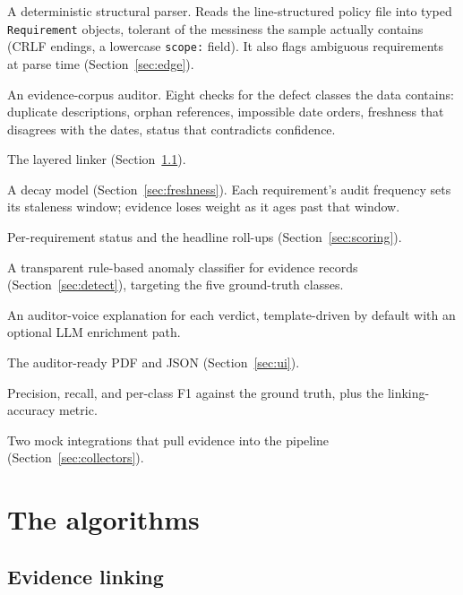 \documentclass[11pt]{article}
\newcommand{\code}[1]{\texttt{\small #1}}
\begin{document}
\begin{description}[leftmargin=0pt,style=nextline,itemsep=3pt,labelsep=0pt]
\item[\textcolor{navy}{ingest}] A deterministic structural parser. Reads the
  line-structured policy file into typed \code{Requirement} objects, tolerant of the
  messiness the sample actually contains (CRLF endings, a lowercase \code{scope:} field).
  It also flags ambiguous requirements at parse time (Section~\ref{sec:edge}).
\item[\textcolor{navy}{integrity}] An evidence-corpus auditor. Eight checks for the
  defect classes the data contains: duplicate descriptions, orphan references, impossible
  date orders, freshness that disagrees with the dates, status that contradicts confidence.
\item[\textcolor{navy}{mapping}] The layered linker (Section~\ref{sec:linking}).
\item[\textcolor{navy}{freshness}] A decay model (Section~\ref{sec:freshness}). Each
  requirement's audit frequency sets its staleness window; evidence loses weight as it ages
  past that window.
\item[\textcolor{navy}{scoring}] Per-requirement status and the headline roll-ups
  (Section~\ref{sec:scoring}).
\item[\textcolor{navy}{detect}] A transparent rule-based anomaly classifier for evidence
  records (Section~\ref{sec:detect}), targeting the five ground-truth classes.
\item[\textcolor{navy}{narrative}] An auditor-voice explanation for each verdict,
  template-driven by default with an optional LLM enrichment path.
\item[\textcolor{navy}{report}] The auditor-ready PDF and JSON (Section~\ref{sec:ui}).
\item[\textcolor{navy}{evaluation}] Precision, recall, and per-class F1 against the ground
  truth, plus the linking-accuracy metric.
\item[\textcolor{navy}{collectors}] Two mock integrations that pull evidence into the
  pipeline (Section~\ref{sec:collectors}).
\end{description}

\section{The algorithms}

\subsection{Evidence linking}\label{sec:linking}
\end{document}
